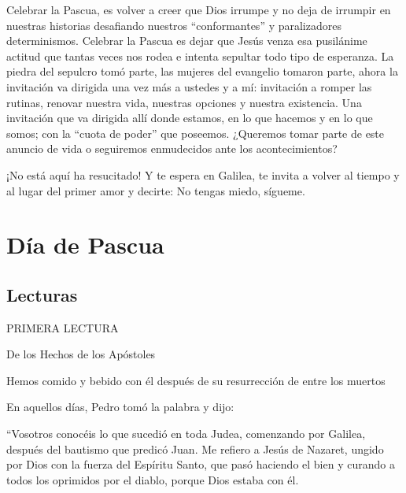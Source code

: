 			\begin{body}Celebrar la Pascua, es volver a creer que Dios irrumpe y no deja de irrumpir en nuestras historias desafiando nuestros “conformantes” y paralizadores determinismos. Celebrar la Pascua es dejar que Jesús venza esa pusilánime actitud que tantas veces nos rodea e intenta sepultar todo tipo de esperanza. La piedra del sepulcro tomó parte, las mujeres del evangelio tomaron parte, ahora la invitación va dirigida una vez más a ustedes y a mí: invitación a romper las rutinas, renovar nuestra vida, nuestras opciones y nuestra existencia. Una invitación que va dirigida allí donde estamos, en lo que hacemos y en lo que somos; con la “cuota de poder” que poseemos. ¿Queremos tomar parte de este anuncio de vida o seguiremos enmudecidos ante los acontecimientos?\end{body}
			
			\begin{body}¡No está aquí ha resucitado! Y te espera en Galilea, te invita a volver al tiempo y al lugar del primer amor y decirte: No tengas miedo, sígueme.\end{body}
			
			\chapter{Día de Pascua}
			
			\section{Lecturas}
			
			\begin{readtitle}PRIMERA LECTURA\end{readtitle}
			
			\begin{readbook}De los Hechos de los Apóstoles \end{readbook}
			
			\begin{readtheme}Hemos comido y bebido con él después de su resurrección de entre los muertos\end{readtheme}
			
			\begin{readbody}En aquellos días, Pedro tomó la palabra y dijo: \end{readbody}
			
			\begin{readtalk}“Vosotros conocéis lo que sucedió en toda Judea, comenzando por Galilea, después del bautismo que predicó Juan. Me refiero a Jesús de Nazaret, ungido por Dios con la fuerza del Espíritu Santo, que pasó haciendo el bien y curando a todos los oprimidos por el diablo, porque Dios estaba con él. \end{readtalk}
			
